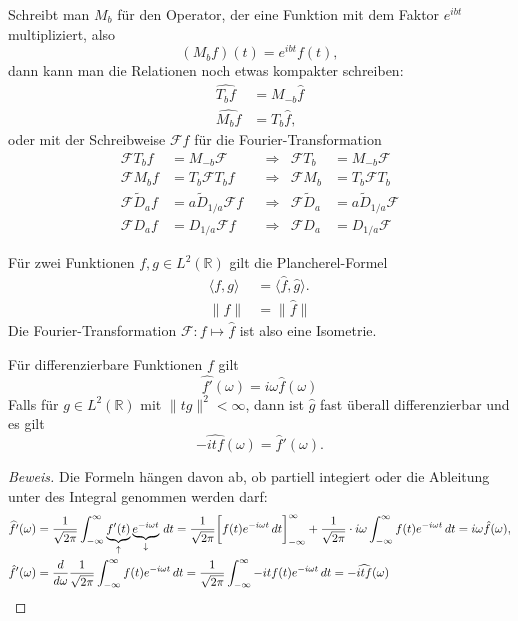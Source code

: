 Schreibt man $M_b$ für den Operator, der eine Funktion mit dem
Faktor $e^{ibt}$ multipliziert, also
\[
(M_bf)(t) = e^{ibt}f(t),
\]
dann kann man die Relationen noch etwas kompakter schreiben:
\begin{align*}
\widehat{T_bf}
&=
M_{-b}\hat{f}
\\
\widehat{M_bf}
&=
T_b\hat{f},
\end{align*}
oder mit der Schreibweise $\mathcal{F}f$ für die Fourier-Transformation
\[
\begin{aligned}
\mathcal{F}T_b f &= M_{-b}\mathcal F
&&\Rightarrow &
\mathcal{F}T_b &= M_{-b}\mathcal{F}
\\
\mathcal{F}M_b f&=T_b\mathcal{F}T_bf
&&\Rightarrow &
\mathcal{F}M_b&=T_b\mathcal{F}T_b
\\
\mathcal{F}\tilde{D}_af&=a \tilde{D}_{1/a} \mathcal F f
&&\Rightarrow &
\mathcal{F}\tilde{D}_a&=a \tilde{D}_{1/a} \mathcal F 
\\
\mathcal{F}D_af&=D_{1/a} \mathcal F f
&&\Rightarrow &
\mathcal{F}D_a&= D_{1/a} \mathcal F 
\end{aligned}
\]

\begin{satz}
Für zwei Funktionen $f,g\in L^2(\mathbb R)$ gilt die Plancherel-Formel
\begin{align*}
\langle f,g\rangle
&=
\langle \hat{f},\hat{g}\rangle.
\\
\|f\|&=\|\hat{f}\|
\end{align*}
Die Fourier-Transformation $\mathcal{F}\colon f\mapsto \hat{f}$ ist
also eine Isometrie.
\end{satz}

\begin{satz}
Für differenzierbare Funktionen $f$ gilt
\[
\widehat{f'}(\omega) = i\omega \hat{f}(\omega)
\]
Falls für $g\in L^2(\mathbb R)$ mit $\|tg\|^2<\infty$, dann ist $\hat{g}$
fast überall differenzierbar und es gilt
\[
-\widehat{i t f}(\omega) = \hat{f}'(\omega).
\]
\end{satz}

\begin{proof}[Beweis]
Die Formeln hängen davon ab, ob partiell integiert oder die Ableitung
unter des Integral genommen werden darf:
\begin{align*}
\widehat{f'}(\omega)
&=
\frac{1}{\sqrt{2\pi}}
\int_{-\infty}^\infty \underbrace{f'(t)}_{\uparrow}\underbrace{e^{-i\omega t}}_{\downarrow}\,dt
=
\frac{1}{\sqrt{2\pi}}
\biggl[
f(t)e^{-i\omega t}\,dt
\biggr]_{-\infty}^\infty
+
\frac{1}{\sqrt{2\pi}}
\cdot
i\omega
\int_{-\infty}^\infty f(t)e^{-i\omega t}\,dt
=
i\omega\hat{f}(\omega),
\\
\hat{f}'(\omega)
&=
\frac{d}{d\omega}
\frac{1}{\sqrt{2\pi}} \int_{-\infty}^\infty
f(t) e^{-i\omega t}\,dt
=
\frac{1}{\sqrt{2\pi}} \int_{-\infty}^\infty
-it f(t) e^{-i\omega t}\,dt
=
-\widehat{itf}(\omega)
\qedhere
\end{align*}
\end{proof}

